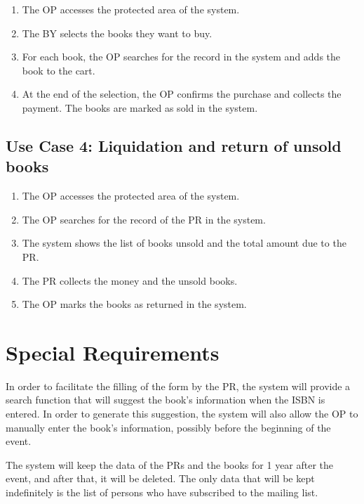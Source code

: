 \begin{enumerate}
    \item The OP accesses the protected area of the system.
    \item The BY selects the books they want to buy.
    \item For each book, the OP searches for the record in the system and adds the book to the cart.
    \item At the end of the selection, the OP confirms the purchase and collects the payment. The books are marked as sold in the system.
\end{enumerate}

\subsection{Use Case 4: Liquidation and return of unsold books}

\begin{enumerate}
    \item The OP accesses the protected area of the system.
    \item The OP searches for the record of the PR in the system.
    \item The system shows the list of books unsold and the total amount due to the PR.
    \item The PR collects the money and the unsold books.
    \item The OP marks the books as returned in the system.
\end{enumerate}

\section{Special Requirements}

In order to facilitate the filling of the form by the PR, the system will provide a search function that will suggest the book's information when the ISBN is entered. In order to generate this suggestion, the system will also allow the OP to manually enter the book's information, possibly before the beginning of the event.

The system will keep the data of the PRs and the books for 1 year after the event, and after that, it will be deleted. The only data that will be kept indefinitely is the list of persons who have subscribed to the mailing list.